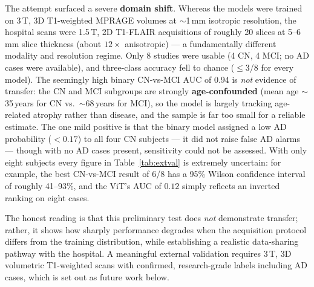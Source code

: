 The attempt surfaced a severe \textbf{domain shift}. Whereas the models were trained on 3\,T, 3D T1-weighted MPRAGE volumes at $\sim$1\,mm isotropic resolution, the hospital scans were 1.5\,T, 2D T1-FLAIR acquisitions of roughly 20 slices at 5--6\,mm slice thickness (about $12\times$ anisotropic) --- a fundamentally different modality and resolution regime. Only 8 studies were usable (4 CN, 4 MCI; no AD cases were available), and three-class accuracy fell to chance ($\le$3/8 for every model). The seemingly high binary CN-vs-MCI AUC of 0.94 is \emph{not} evidence of transfer: the CN and MCI subgroups are strongly \textbf{age-confounded} (mean age $\sim$35\,years for CN vs.\ $\sim$68\,years for MCI), so the model is largely tracking age-related atrophy rather than disease, and the sample is far too small for a reliable estimate. The one mild positive is that the binary model assigned a low AD probability ($<0.17$) to all four CN subjects --- it did not raise false AD alarms --- though with no AD cases present, sensitivity could not be assessed. With only eight subjects every figure in Table~\ref{tab:extval} is extremely uncertain: for example, the best CN-vs-MCI result of 6/8 has a 95\% Wilson confidence interval of roughly 41--93\%, and the ViT's AUC of $0.12$ simply reflects an inverted ranking on eight cases.

The honest reading is that this preliminary test does \emph{not} demonstrate transfer; rather, it shows how sharply performance degrades when the acquisition protocol differs from the training distribution, while establishing a realistic data-sharing pathway with the hospital. A meaningful external validation requires 3\,T, 3D volumetric T1-weighted scans with confirmed, research-grade labels including AD cases, which is set out as future work below.

